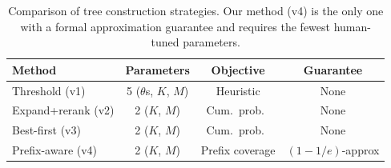\begin{table}[t]
\centering
\small
\caption{Comparison of tree construction strategies.  Our method (v4)
is the only one with a formal approximation guarantee and requires the
fewest human-tuned parameters.}
\label{tab:method-comparison}
\begin{tabular}{@{}lccc@{}}
\toprule
Method & Parameters & Objective & Guarantee \\
\midrule
Threshold (v1)    & 5 ($\theta$s, $K$, $M$) & Heuristic       & None \\
Expand+rerank (v2)& 2 ($K$, $M$)            & Cum.\ prob.\    & None \\
Best-first (v3)   & 2 ($K$, $M$)            & Cum.\ prob.\    & None \\
Prefix-aware (v4) & 2 ($K$, $M$)            & Prefix coverage & $(1{-}1/e)$-approx \\
\bottomrule
\end{tabular}
\end{table}

